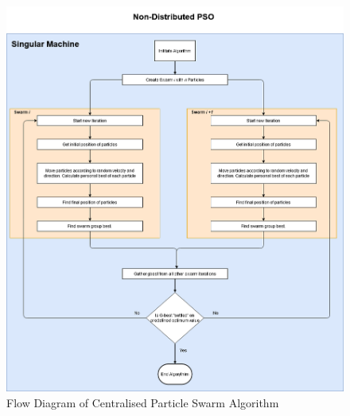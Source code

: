 \documentclass[oneside,12pt]{book}
\begin{document}
\begin{figure}[H]
    \centering
    \includegraphics[scale=0.4]{Images/FlowDiagramNonDistibutedPSO.png}
    \caption{Flow Diagram of Centralised Particle Swarm Algorithm}
    \label{fig:Flow Diagram of Centralised Particle Swarm Algorithm}
\end{figure}
\end{document}

